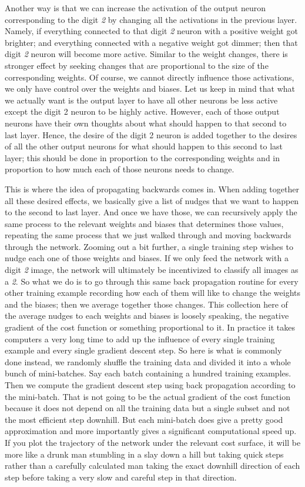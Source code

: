 \documentclass[master]{thesis-uestc}
\begin{document}
Another way is that we can increase the activation of the output neuron corresponding to the digit \textit{2} by changing all the activations in the previous layer. Namely, if everything connected to that digit \textit{2} neuron with a positive weight got brighter; and everything connected with a negative weight got dimmer; then that digit \textit{2} neuron will become more active. Similar to the weight changes, there is stronger effect by seeking changes that are proportional to the size of the corresponding weights. Of course, we cannot directly influence those activations, we only have control over the weights and biases. Let us keep in mind that what we actually want is the output layer to have all other neurons be less active except the digit 2 neuron to be highly active. However, each of those output neurons have their own thoughts about what should happen to that second to last layer. Hence, the desire of the digit 2 neuron is added together to the desires of all the other output neurons for what should happen to this second to last layer; this should be done in proportion to the corresponding weights and in proportion to how much each of those neurons needs to change.

This is where the idea of propagating backwards comes in. When adding together all these desired effects, we basically give a list of nudges that we want to happen to the second to last layer. And once we have those, we can recursively apply the same process to the relevant weights and biases that determines those values, repeating the same process that we just walked through and moving backwards through the network. Zooming out a bit further, a single training step wishes to nudge each one of those weights and biases. If we only feed the network with a digit \textit{2} image, the network will ultimately be incentivized to classify all images as a \textit{2}. So what we do is to go through this same back propagation routine for every other training example recording how each of them will like to change the weights and the biases; then we average together those changes. This collection here of the average nudges to each weights and biases is loosely speaking, the negative gradient of the cost function or something proportional to it. In practice it takes computers a very long time to add up the influence of every single training example and every single gradient descent step. So here is what is commonly done instead, we randomly shuffle the training data and divided it into a whole bunch of mini-batches. Say each batch containing a hundred training examples. Then we compute the gradient descent step using back propagation according to the mini-batch. That is not going to be the actual gradient of the cost function because it does not depend on all the training data but a single subset and not the most efficient step downhill. But each mini-batch does give a pretty good approximation and more importantly gives a significant computational speed up. If you plot the trajectory of the network under the relevant cost surface, it will be more like a drunk man stumbling in a slay down a hill but taking quick steps rather than a carefully calculated man taking the exact downhill direction of each step before taking a very slow and careful step in that direction.
\end{document}
